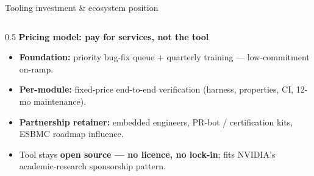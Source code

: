 \documentclass[aspectratio=169,11pt]{beamer}
\newcommand{\hil}[1]{\textbf{\textcolor{nvgreendark}{#1}}}
\begin{document}
\begin{frame}{Tooling investment \& ecosystem position}
\begin{columns}[T,onlytextwidth]
\begin{column}{0.5\textwidth}
      \vspace{0.3em}
      \textbf{Pricing model: pay for services, not the tool}
      \begin{itemize}\setlength\itemsep{0.1em}
        \item \hil{Foundation:} priority bug-fix queue + quarterly
              training --- low-commitment on-ramp.
        \item \hil{Per-module:} fixed-price end-to-end verification
              (harness, properties, CI, 12-mo maintenance).
        \item \hil{Partnership retainer:} embedded engineers, PR-bot
              / certification kits, ESBMC roadmap influence.
        \item Tool stays \hil{open source --- no licence, no lock-in};
              fits NVIDIA's academic-research sponsorship pattern.
      \end{itemize}
    \end{column}
  \end{columns}
\end{frame}
\end{document}
